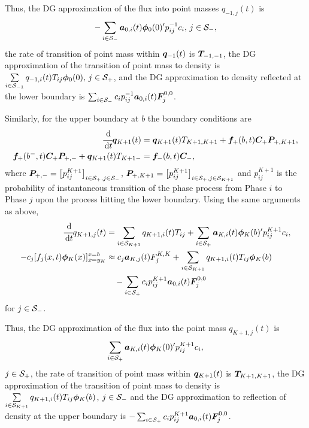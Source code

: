 Thus, the DG approximation of the flux into point masses \(q_{{-1},j}(t)\) is \[-\sum_{i\in\mathcal{S}_-}\boldsymbol a_{0,i}(t)\boldsymbol \phi_0(0)'{} p_{ij}^{-1} c_i,\,j\in\mathcal{S}_-,\] the rate of transition of point mass within \(\boldsymbol q_{{-1}}(t)\) is \(\boldsymbol T_{{-1},{-1}}\), the DG approximation of the transition of point mass to density is \(\sum\limits_{i\in\mathcal{S}_{-1}}q_{{-1},i}(t)T_{ij}\boldsymbol\phi_0(0),\,j\in\mathcal{S}_+\), and the DG approximation to density reflected at the lower boundary is \(\sum_{i\in\mathcal{S}_-}c_ip_{ij}^{-1}\boldsymbol a_{0,i}(t)\boldsymbol F_j^{0,0}\). 

Similarly, for the upper boundary at \(b\) the boundary conditions are 
\begin{align*}
\cfrac{\, \mathrm{d}}{\, \mathrm{d} t}\boldsymbol q_{K+1}(t) &= \boldsymbol q_{K+1}(t) T_{{K+1}, {K+1}} + \boldsymbol f_+(b,t)\boldsymbol C_+\boldsymbol P_{+,{K+1}},\\
\boldsymbol f_+(b^-,t)\boldsymbol C_+\boldsymbol P_{+,-} + \boldsymbol q_{K+1}(t)T_{{K+1}-}&=\boldsymbol f_-(b,t)\boldsymbol C_-,
\end{align*}
where \(\boldsymbol P_{+,-} = \left[p_{ij}^{K+1}\right]_{i\in\mathcal{S}_+,j\in\mathcal{S}_{-}}\), \(\boldsymbol P_{+,K+1} = \left[p_{ij}^{K+1}\right]_{i\in\mathcal{S}_+,j\in\mathcal{S}_{K+1}}\) and \(p_{ij}^{K+1}\) is the probability of instantaneous transition of the phase process from Phase \(i\) to Phase \(j\) upon the process hitting the lower boundary. Using the same arguments as above, 
\begin{align*}
\cfrac{\, \mathrm{d}}{\, \mathrm{d} t} q_{{K+1},j}(t) &= \sum_{i\in\mathcal{S}_{K+1}}q_{{K+1},i}(t) T_{ij} + \sum_{i\in\mathcal{S}_+}\boldsymbol a_{K,i}(t)\boldsymbol \phi_K(b)'{}p_{ij}^{K+1} c_i,
\\-c_j[f_j(x,t)\boldsymbol\phi_K(x)]_{x=y_K}^{x=b} & \approx c_j\boldsymbol a_{K,j}(t)F_j^{K,K}+\sum_{i\in\mathcal{S}_{K+1}}q_{{K+1},i}(t)T_{ij}\boldsymbol\phi_K(b) 
\\&\quad{} - \sum_{i\in\mathcal{S}_+}c_ip_{ij}^{K+1}\boldsymbol a_{0,i}(t)\boldsymbol F_j^{0,0}
\end{align*}
for \(j\in\mathcal{S}_-\). 

Thus, the DG approximation of the flux into the point mass \(q_{{K+1},j}(t)\) is 
\[\sum_{i\in\mathcal{S}_+}\boldsymbol a_{K,i}(t)\boldsymbol \phi_K(0)'{} p_{ij}^{K+1} c_i,\]
\(j\in\mathcal{S}_+\), the rate of transition of point mass within \(\boldsymbol q_{{K+1}}(t)\) is \(\boldsymbol T_{{K+1},{K+1}}\), the DG approximation of the transition of point mass to density is \(\sum\limits_{i\in\mathcal{S}_{K+1}}q_{{K+1},i}(t)T_{ij}\boldsymbol\phi_K(b)\), \(j\in\mathcal{S}_-\) and the DG approximation to reflection of density at the upper boundary is \(- \sum_{i\in\mathcal{S}_+}c_ip_{ij}^{K+1}\boldsymbol a_{0,i}(t)\boldsymbol F_j^{0,0}\). 

